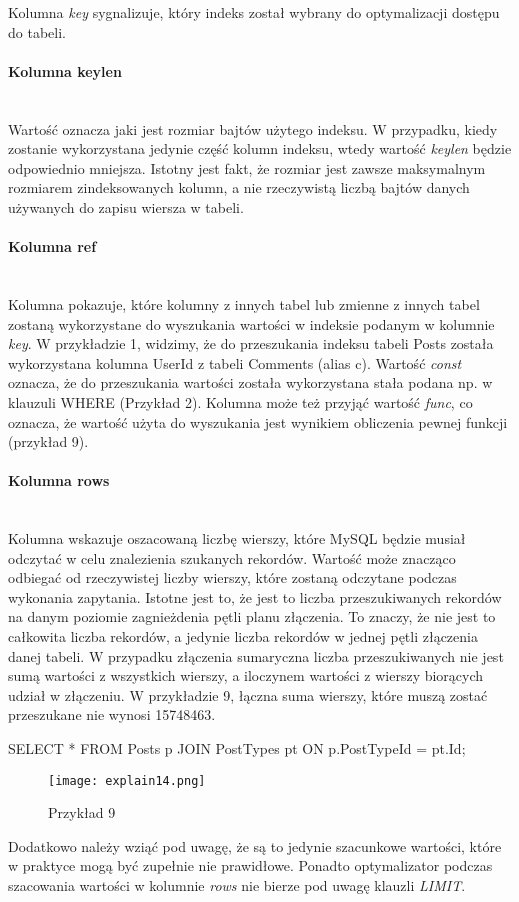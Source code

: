 Kolumna \textit{key} sygnalizuje, który indeks został wybrany do optymalizacji dostępu do tabeli.

\paragraph{Kolumna key\textunderscore len}\leavevmode\\
Wartość oznacza jaki jest rozmiar bajtów użytego indeksu. W przypadku, kiedy zostanie wykorzystana jedynie część kolumn indeksu, wtedy wartość \textit{key\textunderscore len} będzie odpowiednio mniejsza. Istotny jest fakt, że rozmiar jest zawsze maksymalnym rozmiarem zindeksowanych kolumn, a nie rzeczywistą liczbą bajtów danych używanych do zapisu wiersza w tabeli.

\paragraph{Kolumna ref}\leavevmode\\
Kolumna pokazuje, które kolumny z innych tabel lub zmienne z innych tabel zostaną wykorzystane do wyszukania wartości w indeksie podanym w kolumnie \textit{key}. W przykładzie 1, widzimy, że do przeszukania indeksu tabeli Posts została wykorzystana kolumna UserId z tabeli Comments (alias c). Wartość \textit{const} oznacza, że do przeszukania wartości została wykorzystana stała podana np. w klauzuli WHERE (Przykład 2). Kolumna może też przyjąć wartość \textit{func}, co oznacza, że wartość użyta do wyszukania jest wynikiem obliczenia pewnej funkcji (przykład 9).

\paragraph{Kolumna rows}\leavevmode\\
Kolumna wskazuje oszacowaną liczbę wierszy, które MySQL będzie musiał odczytać w celu znalezienia szukanych rekordów. Wartość może znacząco odbiegać od rzeczywistej liczby wierszy, które zostaną odczytane podczas wykonania zapytania. Istotne jest to, że jest to liczba przeszukiwanych rekordów na danym poziomie zagnieżdenia pętli planu złączenia. To znaczy, że nie jest to całkowita liczba rekordów, a jedynie liczba rekordów w jednej pętli złączenia danej tabeli. W przypadku złączenia sumaryczna liczba przeszukiwanych nie jest sumą wartości z wszystkich wierszy, a iloczynem wartości z wierszy biorących udział w złączeniu. W przykładzie 9, łączna suma wierszy, które muszą zostać przeszukane nie wynosi 15748463.
\begin{spverbatim}
	SELECT * FROM Posts p JOIN PostTypes pt ON p.PostTypeId = pt.Id;
\end{spverbatim}
\begin{figure}[H]
	\texttt{[image: explain14.png]} 
	\caption{Przykład 9}
\end{figure}
Dodatkowo należy wziąć pod uwagę, że są to jedynie szacunkowe wartości, które w praktyce mogą być zupełnie nie prawidłowe. Ponadto optymalizator podczas szacowania wartości w kolumnie \textit{rows} nie bierze pod uwagę klauzli \textit{LIMIT}.


